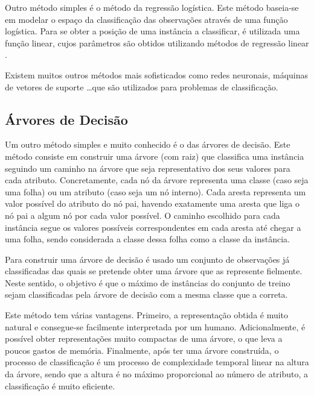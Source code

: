 \documentclass[12pt,a4paper,oneside]{article}
\begin{document}
Outro método simples é o método da regressão logística. Este método
baseia-se em modelar o espaço da classificação das observações através
de uma função logística. Para se obter a posição de uma instância a
classificar, é utilizada uma função linear, cujos parâmetros são
obtidos utilizando métodos de regressão linear \cite{cox:1958}.

Existem muitos outros métodos mais sofisticados como redes neuronais,
máquinas de vetores de suporte \ldots que são utilizados para
problemas de classificação.

\subsection{Árvores de Decisão}

Um outro método simples e muito conhecido é o das árvores de
decisão. Este método consiste em construir uma árvore (com raiz) que
classifica uma instância seguindo um caminho na árvore que seja
representativo dos seus valores para cada atributo. Concretamente,
cada nó da árvore representa uma classe (caso seja uma folha) ou um
atributo (caso seja um nó interno). Cada aresta representa um valor
possível do atributo do nó pai, havendo exatamente uma aresta que liga
o nó pai a algum nó por cada valor possível. O caminho escolhido para
cada instância segue os valores possíveis correspondentes em cada
aresta até chegar a uma folha, sendo considerada a classe dessa folha
como a classe da instância.

Para construir uma árvore de decisão é usado um conjunto de
observações já classificadas das quais se pretende obter uma árvore
que as represente fielmente. Neste sentido, o objetivo é que o máximo
de instâncias do conjunto de treino sejam classificadas pela árvore de
decisão com a mesma classe que a correta.

Este método tem várias vantagens. Primeiro, a representação obtida é
muito natural e consegue-se facilmente interpretada por um
humano. Adicionalmente, é possível obter representações muito
compactas de uma árvore, o que leva a poucos gastos de
memória. Finalmente, após ter uma árvore construída, o processo de
classificação é um processo de complexidade temporal linear na altura
da árvore, sendo que a altura é no máximo proporcional ao número de
atributo, a classificação é muito eficiente.
\end{document}
